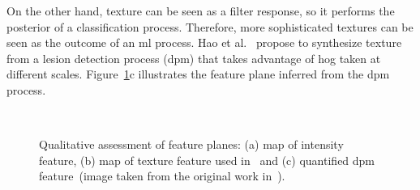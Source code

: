 \documentclass[authoryear,preprint,review,12pt]{elsarticle}
\begin{document}
On the other hand, texture can be seen as a filter response, so it performs the posterior of a classification process. Therefore, more sophisticated textures can be seen as the outcome of an \ac{ml} process. Hao et al.~\cite{hao2012combining} propose to synthesize texture from a lesion detection process (\ac{dpm}) that takes advantage of \ac{hog} taken at different scales. Figure~\ref{fig:texture}c illustrates the feature plane inferred from the \ac{dpm} process.


\begin{figure}[Htbp]
\centering
{}\,
\,
\caption[Qualitative assessment of some feature examples]{Qualitative assessment of feature planes: (a) \acf{map} of intensity feature, (b) \ac{map} of texture feature used in~\cite{massich2010lesion,Madabhushi:2003p6036} and (c) quantified \ac{dpm} feature~\cite{hao2012combining}(image taken from the original work in~\cite{hao2012combining}).}
\label{fig:texture}
\end{figure}


 
\end{document}
